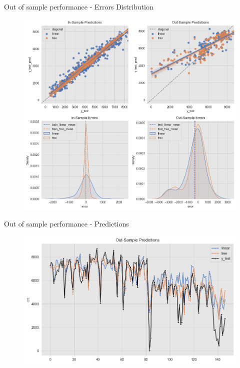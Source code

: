 \documentclass[10pt]{beamer}
\begin{document}
\begin{frame}{Out of sample performance - Errors Distribution}
\begin{center}
  \begin{figure}
    \includegraphics[scale=0.35]{images/interpretable_ml_44_0.png} 
  \end{figure}
\end{center}
\end{frame}

\begin{frame}{Out of sample performance - Predictions}
\begin{center}
  \begin{figure}
    \includegraphics[scale=0.45]{images/interpretable_ml_47_0.png} 
  \end{figure}
\end{center}
\end{frame}
\end{document}
